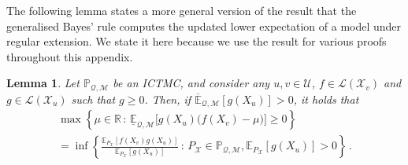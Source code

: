\documentclass[3p]{elsarticle}
\newtheorem{lemma}[theorem]{Lemma}
\newcommand{\reals}{\mathbb{R}}
\newcommand{\states}{\mathcal{X}}
\newcommand{\lexp}{\underline{\mathbb{E}}_{\rateset,\mathcal{M}}}
\newcommand{\uexp}{\overline{\mathbb{E}}_{\rateset,\mathcal{M}}}
\newcommand{\gambles}{\mathcal{L}}
\newcommand{\rateset}{\mathcal{Q}}
\begin{document}
The following lemma states a more general version of the result that the generalised Bayes' rule computes the updated lower expectation of a model under regular extension. We state it here because we use the result for various proofs throughout this appendix.

\begin{lemma}\label{lemma:general_regular_extension}
Let $\mathbb{P}_{\rateset,\mathcal{M}}$ be an ICTMC, and consider any $u,v\in\mathcal{U}$, $f\in\gambles(\states_v)$ and $g\in\gambles(\states_u)$ such that $g\geq 0$. Then, if $\uexp[g(X_u)]>0$, it holds that
\begin{multline*}
 \max\left\{\mu\in\reals\,:\, \lexp\bigl[g(X_u)\bigl(f(X_v) - \mu\bigr)\bigr] \geq 0\right\} \\
 = \inf\left\{ \frac{\mathbb{E}_{P_\states}[f(X_v)g(X_u)]}{\mathbb{E}_{P_\states}[g(X_u)]}\,:\,{P_\states}\in\mathbb{P}_{\rateset,\mathcal{M}}, \mathbb{E}_{P_\states}[g(X_u)]>0 \right\}\,.
\end{multline*}
\end{lemma}
\end{document}
